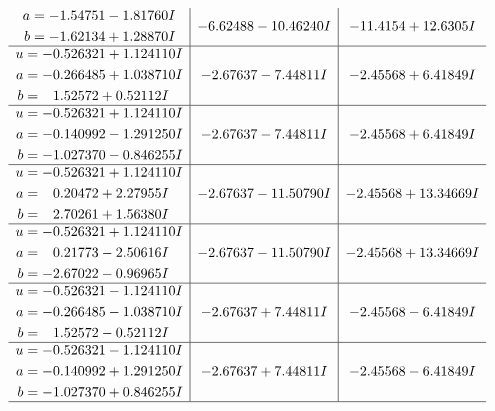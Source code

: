 \documentclass[1p]{elsarticle_modified}
\theoremstyle{definition}
\begin{document}
$$\begin{array}{c|c|c}
\begin{aligned}
a &= -1.54751 - 1.81760 I \\
b &= -1.62134 + 1.28870 I\end{aligned}
 & -6.62488 - 10.46240 I & -11.4154 + 12.6305 I \\ \hline\begin{aligned}
u &= -0.526321 + 1.124110 I \\
a &= -0.266485 + 1.038710 I \\
b &= \phantom{-}1.52572 + 0.52112 I\end{aligned}
 & -2.67637 - 7.44811 I & -2.45568 + 6.41849 I \\ \hline\begin{aligned}
u &= -0.526321 + 1.124110 I \\
a &= -0.140992 - 1.291250 I \\
b &= -1.027370 - 0.846255 I\end{aligned}
 & -2.67637 - 7.44811 I & -2.45568 + 6.41849 I \\ \hline\begin{aligned}
u &= -0.526321 + 1.124110 I \\
a &= \phantom{-}0.20472 + 2.27955 I \\
b &= \phantom{-}2.70261 + 1.56380 I\end{aligned}
 & -2.67637 - 11.50790 I & -2.45568 + 13.34669 I \\ \hline\begin{aligned}
u &= -0.526321 + 1.124110 I \\
a &= \phantom{-}0.21773 - 2.50616 I \\
b &= -2.67022 - 0.96965 I\end{aligned}
 & -2.67637 - 11.50790 I & -2.45568 + 13.34669 I \\ \hline\begin{aligned}
u &= -0.526321 - 1.124110 I \\
a &= -0.266485 - 1.038710 I \\
b &= \phantom{-}1.52572 - 0.52112 I\end{aligned}
 & -2.67637 + 7.44811 I & -2.45568 - 6.41849 I \\ \hline\begin{aligned}
u &= -0.526321 - 1.124110 I \\
a &= -0.140992 + 1.291250 I \\
b &= -1.027370 + 0.846255 I\end{aligned}
 & -2.67637 + 7.44811 I & -2.45568 - 6.41849 I\\
 \hline 
 \end{array}$$\newpage$$\begin{array}{c|c|c}  

\end{array}$$
\end{document}
